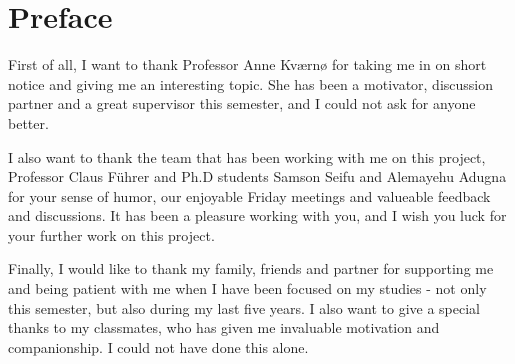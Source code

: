\chapter*{Preface}
First of all, I want to thank Professor Anne Kværnø for taking me in on short notice and giving me an interesting topic. She has been a motivator, discussion partner and a great supervisor this semester, and I could not ask for anyone better.

I also want to thank the team that has been working with me on this project, Professor Claus Führer and Ph.D students Samson Seifu and Alemayehu Adugna for your sense of humor, our enjoyable Friday meetings and valueable feedback and discussions. It has been a pleasure working with you, and I wish you luck for your further work on this project.

Finally, I would like to thank my family, friends and partner for supporting me and being patient with me when I have been focused on my studies - not only this semester, but also during my last five years. I also want to give a special thanks to my classmates, who has given me invaluable motivation and companionship. I could not have done this alone.
